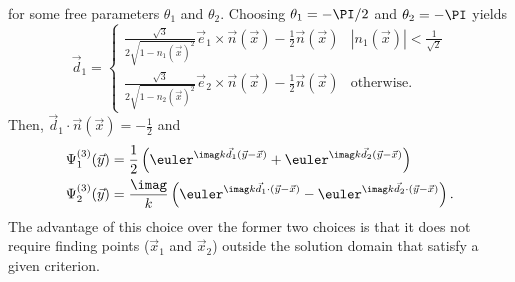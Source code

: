 for some free parameters $\theta_1$ and $\theta_2$. Choosing $\theta_1=-\PI/2$ and $\theta_2=-\PI$ yields
\begin{equation}\label{Eq3:d1d2}
	\vec{d}_1 = \begin{cases}\frac{\sqrt{3}}{2\sqrt{1-n_1(\vec{x})^2}}\vec{e}_1\times\vec{n}(\vec{x})-\frac{1}{2}\vec{n}(\vec{x}) & |n_1(\vec{x})| < \frac{1}{\sqrt{2}}\\
	\frac{\sqrt{3}}{2\sqrt{1-n_2(\vec{x})^2}}\vec{e}_2\times\vec{n}(\vec{x})-\frac{1}{2}\vec{n}(\vec{x}) & \text{otherwise.}
	\end{cases}
\end{equation}
Then, $\vec{d}_1\cdot\vec{n}(\vec{x}) = -\frac{1}{2}$ and
\begin{equation}
\begin{aligned}
	\Psi_1^{(3)}(\vec{y}) &= \frac12\left(\euler^{\imag k\vec{d}_1(\vec{y}-\vec{x})} +\euler^{\imag k\vec{d}_2(\vec{y}-\vec{x})}\right)\\
	\Psi_2^{(3)}(\vec{y}) &= \frac{\imag}{k}\left(\euler^{\imag k\vec{d}_1\cdot(\vec{y}-\vec{x})}-\euler^{\imag k\vec{d}_2\cdot(\vec{y}-\vec{x})}\right).
\end{aligned}	
\end{equation}
The advantage of this choice over the former two choices is that it does not require finding points ($\vec{x}_1$ and $\vec{x}_2$) outside the solution domain that satisfy a given criterion.
